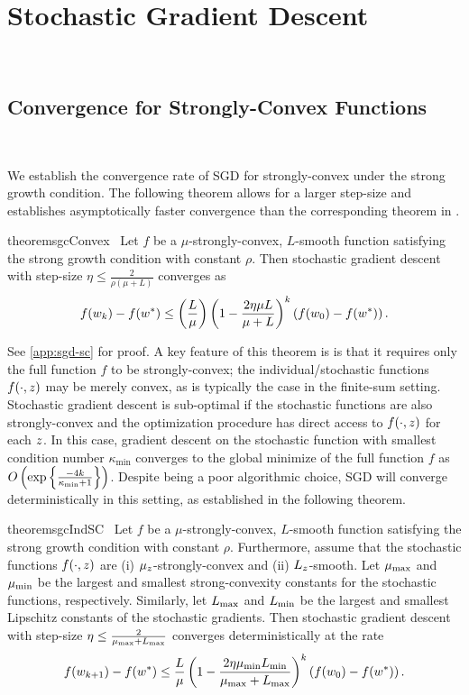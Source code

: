
\chapter{Stochastic Gradient Descent}~\label{ch:sgd}


\section{Convergence for Strongly-Convex Functions}~\label{sec:sgd-sc}

We establish the convergence rate of SGD for strongly-convex under the strong growth condition. 
The following theorem allows for a larger step-size and establishes asymptotically faster convergence than the corresponding theorem in \citet{vaswani2019fast}.

\begin{restatable}{theorem}{sgcConvex}~\label{thm:sgc-convex}
    Let \( f \) be a \( \mu \)-strongly-convex, \( L \)-smooth function satisfying the strong growth condition with constant \( \rho \).
    Then stochastic gradient descent with step-size \( \eta \leq \frac{2}{\rho(\mu + L)} \) converges as 
    \[ f(w_k) - f(w^*) \leq \left(\frac{L}{\mu}\right)\left(1 - \frac{2\eta \mu L}{\mu + L}\right)^k \left(f(w_0) - f(w^*)\right). \] 
\end{restatable}

See \autoref{app:sgd-sc} for proof.
A key feature of this theorem is is that it requires only the full function \( f \) to be strongly-convex; the individual/stochastic functions \( f(\cdot, z) \) may be merely convex, as is typically the case in the finite-sum setting.
Stochastic gradient descent is sub-optimal if the stochastic functions are also strongly-convex and the optimization procedure has direct access to \( f(\cdot, z ) \) for each \( z \).
In this case, gradient descent on the stochastic function with smallest condition number \( \kappa_{\text{min}} \) converges to the global minimize of the full function \( f \) as \( O\left(\exp\left\{\frac{-4 k}{\kappa_{\text{min}} + 1}\right\}\right) \).
Despite being a poor algorithmic choice, SGD will converge deterministically in this setting, as established in the following theorem.

\begin{restatable}{theorem}{sgcIndSC}~\label{thm:sgc-ind-sc}
    Let \( f \) be a \( \mu \)-strongly-convex, \( L \)-smooth function satisfying the strong growth condition with constant \( \rho \).
    Furthermore, assume that the stochastic functions \( f(\cdot, z) \) are (i) \( \mu_z \)-strongly-convex and (ii) \( L_z \)-smooth.
    Let \( \mu_{\text{max}} \) and \( \mu_{\text{min}} \) be the largest and smallest strong-convexity constants for the stochastic functions, respectively.
    Similarly, let \( L_{\text{max}} \) and \( L_{\text{min}} \) be the largest and smallest Lipschitz constants of the stochastic gradients.
    Then stochastic gradient descent with step-size \( \eta \leq \frac{2}{\mu_{\text{max}} + L_{\text{max}}} \) converges deterministically at the rate 
    \[ f(w_{k+1}) - f(w^*) \leq \frac{L}{\mu} \left(1 - \frac{2 \eta \mu_{\text{min}} L_{\text{min}}}{\mu_{\text{max}} + L_{\text{max}}}\right)^k \left(f(w_0) - f(w^*)\right). \] 
\end{restatable}


